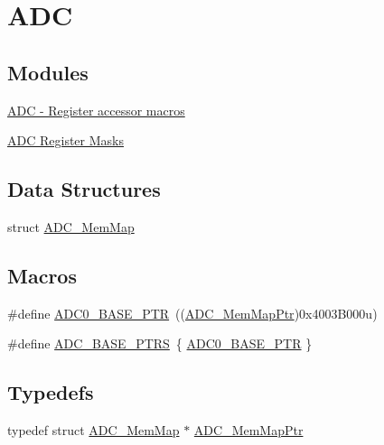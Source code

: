 \hypertarget{group___a_d_c___peripheral}{}\section{A\+D\+C}
\label{group___a_d_c___peripheral}
\subsection*{Modules}
\begin{DoxyCompactItemize}
\item 
\hyperlink{group___a_d_c___register___accessor___macros}{A\+D\+C -\/ Register accessor macros}
\item 
\hyperlink{group___a_d_c___register___masks}{A\+D\+C Register Masks}
\end{DoxyCompactItemize}
\subsection*{Data Structures}
\begin{DoxyCompactItemize}
\item 
struct \hyperlink{struct_a_d_c___mem_map}{A\+D\+C\+\_\+\+Mem\+Map}
\end{DoxyCompactItemize}
\subsection*{Macros}
\begin{DoxyCompactItemize}
\item 
\#define \hyperlink{group___a_d_c___peripheral_ga6cec2f227a3a37a9fccaa830740f1f5e}{A\+D\+C0\+\_\+\+B\+A\+S\+E\+\_\+\+P\+T\+R}~((\hyperlink{group___a_d_c___peripheral_ga1673c677bf7c0ca339c8563e06de75fa}{A\+D\+C\+\_\+\+Mem\+Map\+Ptr})0x4003\+B000u)
\item 
\#define \hyperlink{group___a_d_c___peripheral_gaaa8175a3a2f4efaceeed5bd26c0b2d3f}{A\+D\+C\+\_\+\+B\+A\+S\+E\+\_\+\+P\+T\+R\+S}~\{ \hyperlink{group___a_d_c___peripheral_ga6cec2f227a3a37a9fccaa830740f1f5e}{A\+D\+C0\+\_\+\+B\+A\+S\+E\+\_\+\+P\+T\+R} \}
\end{DoxyCompactItemize}
\subsection*{Typedefs}
\begin{DoxyCompactItemize}
\item 
typedef struct \hyperlink{struct_a_d_c___mem_map}{A\+D\+C\+\_\+\+Mem\+Map} $\ast$ \hyperlink{group___a_d_c___peripheral_ga1673c677bf7c0ca339c8563e06de75fa}{A\+D\+C\+\_\+\+Mem\+Map\+Ptr}
\end{DoxyCompactItemize}



